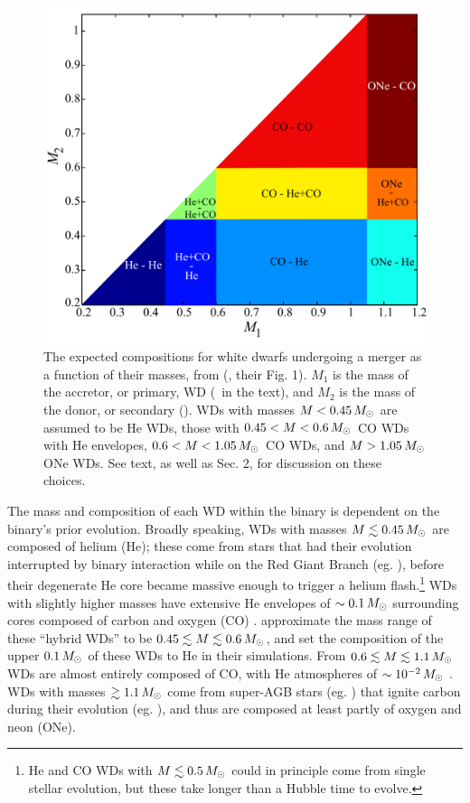 \begin{figure}
\centering
\includegraphics[width=0.6\hsize]{introduction/figures/dan+12_wdbinmass.pdf}
\caption{The expected compositions for white dwarfs undergoing a merger as a function of their masses, from \citeauthor{dan+12} (\citeyear{dan+12}, their Fig. 1).  $M_1$ is the mass of the accretor, or primary, WD (\Ma\ in the text), and $M_2$ is the mass of the donor, or secondary (\Md).  WDs with masses $M<0.45\,\Msun$ are assumed to be He WDs, those with $0.45 < M < 0.6\,\Msun$ CO WDs with He envelopes, $0.6 < M < 1.05\,\Msun$ CO WDs, and $M>1.05\,\Msun$ ONe WDs.  See text, as well as \cite{dan+12} Sec. 2, for discussion on these choices.}
\label{fig:c1_wdbinarymasses}
\end{figure}


The mass and composition of each WD within the binary is dependent on the binary's prior evolution.  Broadly speaking, WDs with masses $M \lesssim 0.45\,\Msun$ are composed of helium (He); these come from stars that had their evolution interrupted by binary interaction while on the Red Giant Branch (eg. \citealt{marsdd95, nele+01, nele+01a}), before their degenerate He core became massive enough to trigger a helium flash.\footnote{He and CO WDs with $M\lesssim0.5\,\Msun$ could in principle come from single stellar evolution, but these take longer than a Hubble time to evolve.}  WDs with slightly higher masses have extensive He envelopes of $\sim0.1\,\Msun$ surrounding cores composed of carbon and oxygen (CO) \citep{ibent85}.  \cite{dan+12} approximate the mass range of these ``hybrid WDs'' to be $0.45 \lesssim M \lesssim 0.6\,\Msun$, and set the composition of the upper $0.1\,\Msun$ of these WDs to He in their simulations.  From $0.6 \lesssim M \lesssim 1.1\,\Msun$ WDs are almost entirely composed of CO, with He atmospheres of $\sim10^{-2}\,\Msun$ \citep{ibent85}.  WDs with masses $\gtrsim 1.1\,\Msun$ come from super-AGB stars (eg. \citealt{herw05}) that ignite carbon during their evolution (eg. \citealt{garc13}), and thus are composed at least partly of oxygen and neon (ONe).  


